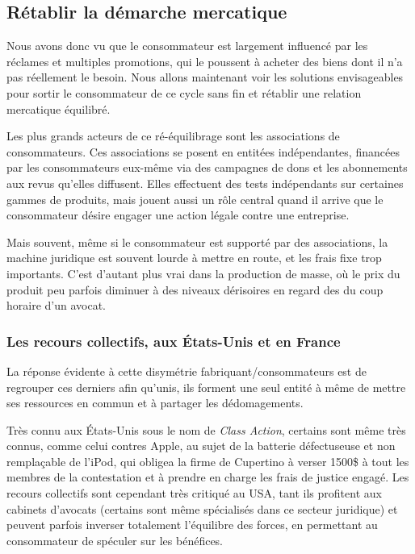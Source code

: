 \subsection{Rétablir la démarche mercatique}
\medbreak
Nous avons donc vu que le consommateur est largement influencé par les réclames et multiples promotions, qui le poussent à acheter des biens dont il n'a pas réellement le besoin. Nous allons maintenant voir les solutions envisageables pour sortir le consommateur de ce cycle sans fin et rétablir une relation mercatique équilibré.

\medbreak
Les plus grands acteurs de ce ré-équilibrage sont les associations de consommateurs. %
Ces associations se posent en entitées indépendantes, financées par les consommateurs eux-même via des campagnes de dons et les abonnements aux revus qu'elles diffusent. 
\smallbreak
Elles effectuent des tests indépendants sur certaines gammes de produits, mais jouent aussi un rôle central quand il arrive que le consommateur désire engager une action légale contre une entreprise.


\medbreak
Mais souvent, même si le consommateur est supporté par des associations, la machine juridique est souvent lourde à mettre en route, et les frais fixe trop importants. C'est d'autant plus vrai dans la production de masse, où le prix du produit peu parfois diminuer à des niveaux dérisoires en regard des du coup horaire d'un avocat.

\subsubsection{Les recours collectifs, aux États-Unis et en France}

\medbreak
La réponse évidente à cette disymétrie fabriquant/consommateurs est de regrouper ces derniers afin qu'unis, ils forment une seul entité à même de mettre ses ressources en commun et à partager les dédomagements.

\bigbreak
Très connu aux États-Unis sous le nom de \textit{Class Action}, certains sont même très connus, comme celui contres Apple, au sujet de la batterie défectuseuse et non remplaçable de l'iPod, qui obligea la firme de Cupertino à verser 1500\$ à tout les membres de la contestation et à prendre en charge les frais de justice engagé\cite{classApple}. Les recours collectifs sont cependant très critiqué au USA, tant ils profitent aux cabinets d'avocats (certains sont même spécialisés dans ce secteur juridique) et peuvent parfois inverser totalement l'équilibre des forces, en permettant au consommateur de spéculer sur les bénéfices.

